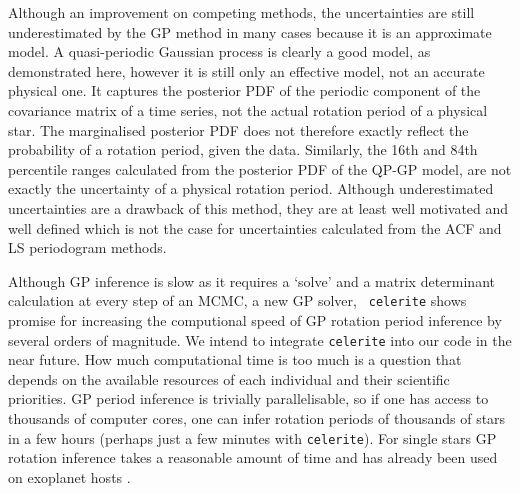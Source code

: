 \documentclass[a4paper,fleqn,usenatbib,useAMS]{mnras}
\newcommand{\response}[1]{{#1}}
\newcommand{\eg}{{\it e.g.}}
\begin{document}
Although an improvement on competing methods, the uncertainties are still
underestimated by the GP method in many cases because it is an approximate
model.
A quasi-periodic Gaussian process is clearly a good model, as demonstrated
here, however it is still only an effective model, not an accurate physical
one.
It captures the posterior PDF of the periodic component of the covariance
matrix of a time series, not the actual rotation period of a physical star.
The marginalised posterior PDF does not therefore exactly reflect the
probability of a rotation period, given the data.
Similarly, the 16th and 84th percentile ranges calculated from the posterior
PDF of the QP-GP model, are not exactly the uncertainty of a physical
rotation period.
Although underestimated uncertainties are a drawback of this method, they are
at least well motivated and well defined which is not the case for
uncertainties calculated from the ACF and LS periodogram methods.

\response{Although GP inference is slow as it requires a `solve' and a matrix
determinant calculation at every step of an MCMC, a new GP solver, {\tt
celerite} \citep{Foremanmackey2017} shows promise for increasing the
computional speed of GP rotation period inference by several orders of
magnitude.
We intend to integrate {\tt celerite} into our code in the near future.
How much computational time is too much is a question that depends on the
available resources of each individual and their scientific priorities.
GP period inference is trivially parallelisable, so if one has access to
thousands of computer cores, one can infer rotation periods of thousands of
stars in a few hours (perhaps just a few minutes with {\tt celerite}).
For single stars GP rotation inference takes a reasonable amount of time and
has already been used on exoplanet hosts \citep[\eg][]{Haywood2014,
Vanderburg2015}.}
\end{document}
